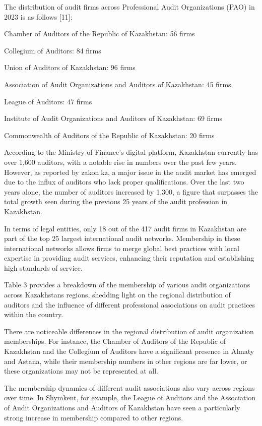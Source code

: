 \begin{multicols}{2}

The distribution of audit firms across Professional Audit Organizations
(PAO) in 2023 is as follows {[}11{]}:

Chamber of Auditors of the Republic of Kazakhstan: 56 firms

Collegium of Auditors: 84 firms

Union of Auditors of Kazakhstan: 96 firms

Association of Audit Organizations and Auditors of Kazakhstan: 45 firms

League of Auditors: 47 firms

Institute of Audit Organizations and Auditors of Kazakhstan: 69 firms

Commonwealth of Auditors of the Republic of Kazakhstan: 20 firms

According to the Ministry of Finance's digital platform, Kazakhstan
currently has over 1,600 auditors, with a notable rise in numbers over
the past few years. However, as reported by zakon.kz, a major issue in
the audit market has emerged due to the influx of auditors who lack
proper qualifications. Over the last two years alone, the number of
auditors increased by 1,300, a figure that surpasses the total growth
seen during the previous 25 years of the audit profession in Kazakhstan.

In terms of legal entities, only 18 out of the 417 audit firms in
Kazakhstan are part of the top 25 largest international audit networks.
Membership in these international networks allows firms to merge global
best practices with local expertise in providing audit services,
enhancing their reputation and establishing high standards of service.

Table 3 provides a breakdown of the membership of various audit
organizations across Kazakhstan\textquotesingle s regions, shedding
light on the regional distribution of auditors and the influence of
different professional associations on audit practices within the
country.

There are noticeable differences in the regional distribution of audit
organization memberships. For instance, the Chamber of Auditors of the
Republic of Kazakhstan and the Collegium of Auditors have a significant
presence in Almaty and Astana, while their membership numbers in other
regions are far lower, or these organizations may not be represented at
all.

The membership dynamics of different audit associations also vary across
regions over time. In Shymkent, for example, the League of Auditors and
the Association of Audit Organizations and Auditors of Kazakhstan have
seen a particularly strong increase in membership compared to other
regions.
\end{multicols}


